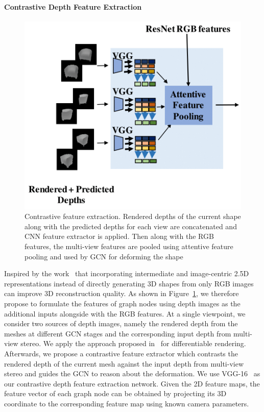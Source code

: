 \label{subsec:contrastive_depth_feature_extraction}
\paragraph{Contrastive Depth Feature Extraction}\vspace{-4mm}
\begin{figure}[th!]
    \begin{center}
        \includegraphics[width=0.8\linewidth]{imgs/contrastive_feature_extractor.png}
    \end{center}
        \caption{Contrastive feature extraction. Rendered depths of the current shape along with the predicted depths for each view are concatenated and CNN feature extractor is applied. Then along with the RGB features, the multi-view features are pooled using attentive feature pooling and used by GCN for deforming the shape}
        \label{fig:contrastive_feature_extractor}
\end{figure}

Inspired by the work~\cite{yao2020front2back} that incorporating intermediate and image-centric 2.5D representations instead of directly generating 3D shapes from only RGB images~\cite{wang2018pixel2mesh,wen2019pixel2mesh++} can improve 3D reconstruction quality.
As shown in Figure~\ref{fig:contrastive_feature_extractor}, we therefore propose to formulate the features of graph nodes using depth images as the additional inputs alongside with the RGB features.
At a single viewpoint, we consider two sources of depth images, namely the rendered depth from the meshes at different GCN stages and the corresponding input depth from multi-view stereo.
We apply the approach proposed in~\cite{kato2018renderer} for differentiable rendering.
Afterwards, we propose a contrastive feature extractor which contrasts the rendered depth of the current mesh against the input depth from multi-view stereo and guides the GCN to reason about the deformation.
We use VGG-16~\cite{simonyan2014vgg} as our contrastive depth feature extraction network.
Given the 2D feature maps, the feature vector of each graph node can be obtained by projecting its 3D coordinate to the corresponding feature map using known camera parameters.

